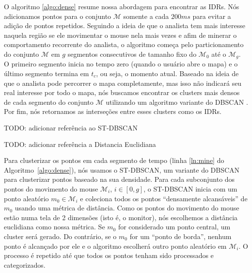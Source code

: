 O algoritmo \ref{algo:dense} resume nossa abordagem para encontrar as IDRs. Nós adicionamos pontos para o conjunto $\mathcal{M}$ somente a cada $200ms$ para evitar a adição de pontos repetidos. Seguindo a ideia de que o analista tem mais interesse naquela região se ele movimentar o mouse nela mais vezes e afim de minerar o comportamento recorrente do analista, o algoritmo começa pelo particionamento do conjunto $\mathcal{M}$ em $g$ segmentos consecutivos de tamanho fixo do $\mathcal{M}_0$ até o $\mathcal{M}_g$. O primeiro segmento inicia no tempo zero (quando o usuário abre o mapa) e o último segmento termina em $t_c$, ou seja, o momento atual. Baseado na ideia de que o analista pode percorrer o mapa completamente, mas isso não indicará seu real interesse por todo o mapa, nós buscamos encontrar os clusters mais densos de cada segmento do conjunto $\mathcal{M}$ utilizando um algoritmo variante do DBSCAN \cite{Ester:1996:DAD:3001460.3001507}. Por fim, nós retornamos as interseções entre esses clusters como os IDRs.



TODO: adicionar referência ao ST-DBSCAN

TODO: adicionar referência a Distancia Euclidiana

Para clusterizar os pontos em cada segmento de tempo (linha \ref{ln:mine} do Algoritmo~\ref{algo:dense}), nós usamos o ST-DBSCAN, um variante do DBSCAN para clusterizar pontos baseado na sua densidade. Para cada subconjunto dos pontos do movimento do mouse $\mathcal{M}_i$, $i \in [0,g]$, o ST-DBSCAN inicia com um ponto aleatório $m_0 \in \mathcal{M}_i$ e coleciona todos os pontos ``densamente alcansáveis'' de $m_0$ usando uma métrica de distância. Como os pontos do movimento do mouse estão numa tela de 2 dimensões (isto é, o monitor), nós escolhemos a distância euclidiana como nossa métrica. Se $m_0$ for considerado um ponto central,  um cluster será gerado. Do contrário, se o $m_0$ for um ``ponto de borda'', nenhum ponto é alcançado por ele e o algoritmo escolherá outro ponto aleatório em $\mathcal{M}_i$. O processo é repetido até que todos os pontos tenham sido processados e categorizados.


